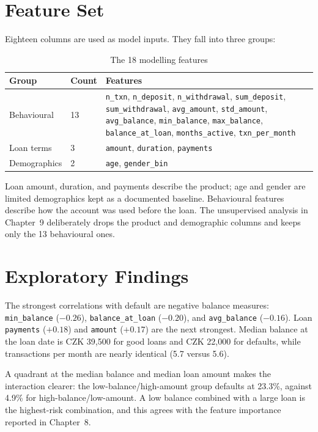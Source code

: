 \section{Feature Set}
Eighteen columns are used as model inputs. They fall into three groups:

\begin{table}[H]
    \centering
    \small
    \renewcommand{\arraystretch}{1.25}
    \begin{tabular}{|l|l|l|}
        \hline
        \textbf{Group} & \textbf{Count} & \textbf{Features} \\
        \hline
        Behavioural & 13 & \texttt{n\_txn}, \texttt{n\_deposit}, \texttt{n\_withdrawal}, \texttt{sum\_deposit}, \texttt{sum\_withdrawal}, \texttt{avg\_amount}, \texttt{std\_amount}, \texttt{avg\_balance}, \texttt{min\_balance}, \texttt{max\_balance}, \texttt{balance\_at\_loan}, \texttt{months\_active}, \texttt{txn\_per\_month} \\
        \hline
        Loan terms & 3 & \texttt{amount}, \texttt{duration}, \texttt{payments} \\
        \hline
        Demographics & 2 & \texttt{age}, \texttt{gender\_bin} \\
        \hline
    \end{tabular}
    \caption{The 18 modelling features}
    \label{tab:feature_groups}
\end{table}

Loan amount, duration, and payments describe the product; age and gender are limited demographics kept as a documented baseline. Behavioural features describe how the account was used before the loan. The unsupervised analysis in Chapter~9 deliberately drops the product and demographic columns and keeps only the 13 behavioural ones.

\section{Exploratory Findings}
The strongest correlations with default are negative balance measures: \texttt{min\_balance} ($-0.26$), \texttt{balance\_at\_loan} ($-0.20$), and \texttt{avg\_balance} ($-0.16$). Loan \texttt{payments} ($+0.18$) and \texttt{amount} ($+0.17$) are the next strongest. Median balance at the loan date is CZK 39,500 for good loans and CZK 22,000 for defaults, while transactions per month are nearly identical (5.7 versus 5.6).

A quadrant at the median balance and median loan amount makes the interaction clearer: the low-balance/high-amount group defaults at 23.3\%, against 4.9\% for high-balance/low-amount. A low balance combined with a large loan is the highest-risk combination, and this agrees with the feature importance reported in Chapter~8.

